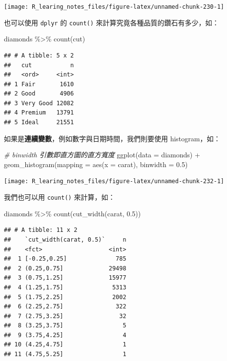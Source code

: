 \documentclass[
]{book}
\newenvironment{Shaded}{\begin{snugshade}}{\end{snugshade}}
\newcommand{\AttributeTok}[1]{\textcolor[rgb]{0.77,0.63,0.00}{#1}}
\newcommand{\CommentTok}[1]{\textcolor[rgb]{0.56,0.35,0.01}{\textit{#1}}}
\newcommand{\FloatTok}[1]{\textcolor[rgb]{0.00,0.00,0.81}{#1}}
\newcommand{\FunctionTok}[1]{\textcolor[rgb]{0.00,0.00,0.00}{#1}}
\newcommand{\NormalTok}[1]{#1}
\newcommand{\SpecialCharTok}[1]{\textcolor[rgb]{0.00,0.00,0.00}{#1}}
\theoremstyle{definition}
\theoremstyle{remark}
\begin{document}
\begin{center}\texttt{[image: R\_learing\_notes\_files/figure-latex/unnamed-chunk-230-1]} \end{center}

也可以使用 \texttt{dplyr} 的 \texttt{count()} 來計算究竟各種品質的鑽石有多少，如：

\begin{Shaded}
\begin{Highlighting}[]
\NormalTok{diamonds }\SpecialCharTok{\%\textgreater{}\%}
  \FunctionTok{count}\NormalTok{(cut)}
\end{Highlighting}
\end{Shaded}

\begin{verbatim}
## # A tibble: 5 x 2
##   cut           n
##   <ord>     <int>
## 1 Fair       1610
## 2 Good       4906
## 3 Very Good 12082
## 4 Premium   13791
## 5 Ideal     21551
\end{verbatim}

如果是\textbf{連續變數}，例如數字與日期時間，我們則要使用 histogram，如：

\begin{Shaded}
\begin{Highlighting}[]
\CommentTok{\# binwidth 引數即直方圖的直方寬度}
\FunctionTok{ggplot}\NormalTok{(}\AttributeTok{data =}\NormalTok{ diamonds) }\SpecialCharTok{+}
  \FunctionTok{geom\_histogram}\NormalTok{(}\AttributeTok{mapping =} \FunctionTok{aes}\NormalTok{(}\AttributeTok{x =}\NormalTok{ carat), }\AttributeTok{binwidth =} \FloatTok{0.5}\NormalTok{)}
\end{Highlighting}
\end{Shaded}

\begin{center}\texttt{[image: R\_learing\_notes\_files/figure-latex/unnamed-chunk-232-1]} \end{center}

我們也可以用 \texttt{count()} 來計算，如：

\begin{Shaded}
\begin{Highlighting}[]
\NormalTok{diamonds }\SpecialCharTok{\%\textgreater{}\%}
  \FunctionTok{count}\NormalTok{(}\FunctionTok{cut\_width}\NormalTok{(carat, }\FloatTok{0.5}\NormalTok{))}
\end{Highlighting}
\end{Shaded}

\begin{verbatim}
## # A tibble: 11 x 2
##    `cut_width(carat, 0.5)`     n
##    <fct>                   <int>
##  1 [-0.25,0.25]              785
##  2 (0.25,0.75]             29498
##  3 (0.75,1.25]             15977
##  4 (1.25,1.75]              5313
##  5 (1.75,2.25]              2002
##  6 (2.25,2.75]               322
##  7 (2.75,3.25]                32
##  8 (3.25,3.75]                 5
##  9 (3.75,4.25]                 4
## 10 (4.25,4.75]                 1
## 11 (4.75,5.25]                 1
\end{verbatim}
\end{document}
